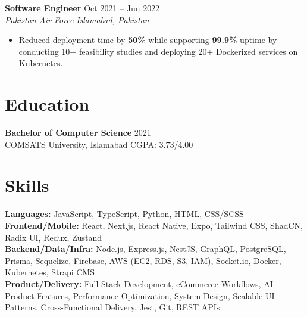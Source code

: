 \documentclass[9pt,letterpaper]{article}
\newcommand{\role}[4]{\textbf{#1} \hfill #2 \\
\textit{#3} \hfill \textit{#4}\\[-5pt]}
\begin{document}
\role{Software Engineer}{Oct 2021 -- Jun 2022}{Pakistan Air Force}{Islamabad, Pakistan}
\begin{itemize}[leftmargin=*, itemsep=0pt, topsep=0pt, partopsep=0pt, parsep=0pt, after=\vspace{1pt}]
  \item Reduced deployment time by \textbf{50\%} while supporting \textbf{99.9\%} uptime by conducting 10+ feasibility studies and deploying 20+ Dockerized services on Kubernetes.
\end{itemize}

\section*{Education}
\textbf{Bachelor of Computer Science} \hfill 2021 \\
COMSATS University, Islamabad \hfill CGPA: 3.73/4.00

\section*{Skills}
\textbf{Languages:} JavaScript, TypeScript, Python, HTML, CSS/SCSS \\
\textbf{Frontend/Mobile:} React, Next.js, React Native, Expo, Tailwind CSS, ShadCN, Radix UI, Redux, Zustand \\
\textbf{Backend/Data/Infra:} Node.js, Express.js, NestJS, GraphQL, PostgreSQL, Prisma, Sequelize, Firebase, AWS (EC2, RDS, S3, IAM), Socket.io, Docker, Kubernetes, Strapi CMS \\
\textbf{Product/Delivery:} Full-Stack Development, eCommerce Workflows, AI Product Features, Performance Optimization, System Design, Scalable UI Patterns, Cross-Functional Delivery, Jest, Git, REST APIs
\end{document}
